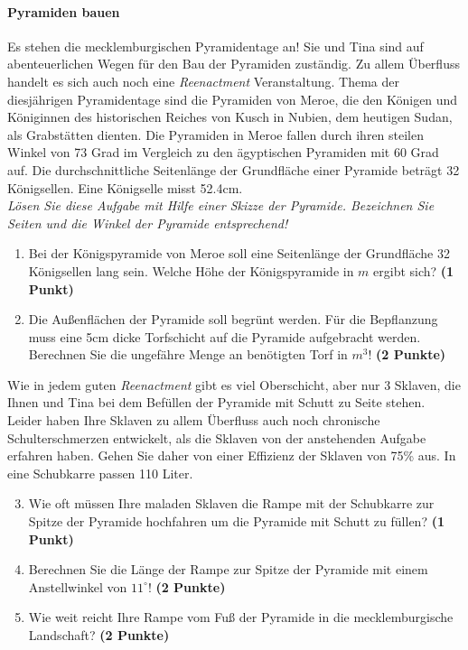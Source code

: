 \documentclass[a4paper, 9pt]{scrartcl}\usepackage[]{graphicx}\usepackage[]{xcolor}
\begin{document}
\paragraph{Pyramiden bauen}



Es stehen die mecklemburgischen Pyramidentage an! Sie und Tina sind auf abenteuerlichen Wegen für den Bau der Pyramiden zuständig. Zu allem Überfluss handelt es sich auch noch eine \textit{Reenactment} Veranstaltung. Thema der diesjährigen Pyramidentage sind die Pyramiden von Meroe, die den Königen und Königinnen des historischen Reiches von Kusch in Nubien, dem heutigen Sudan, als Grabstätten dienten. Die Pyramiden in Meroe fallen durch ihren steilen Winkel von 73 Grad im Vergleich zu den ägyptischen Pyramiden mit 60 Grad auf. Die durchschnittliche Seitenlänge der Grundfläche einer Pyramide beträgt 32 Königsellen. Eine Königselle misst 52.4cm.\\

\textit{Lösen Sie diese Aufgabe mit Hilfe einer Skizze der Pyramide. Bezeichnen Sie Seiten und die Winkel der Pyramide entsprechend!}

\begin{enumerate}
\item Bei der Königspyramide von Meroe soll eine Seitenlänge der Grundfläche 32 Königsellen lang sein. Welche Höhe der Königspyramide in $m$ ergibt sich? \textbf{(1 Punkt)}
\item Die Außenflächen der Pyramide soll begrünt werden. Für die Bepflanzung muss eine 5cm dicke Torfschicht auf die Pyramide aufgebracht werden. Berechnen Sie die ungefähre Menge an benötigten Torf in $m^3$! \textbf{(2 Punkte)}
\end{enumerate}

Wie in jedem guten \textit{Reenactment} gibt es viel Oberschicht, aber nur 3 Sklaven, die Ihnen und Tina bei dem Befüllen der Pyramide mit Schutt zu Seite stehen. Leider haben Ihre Sklaven zu allem Überfluss auch noch chronische Schulterschmerzen entwickelt, als die Sklaven von der anstehenden Aufgabe erfahren haben. Gehen Sie daher von einer Effizienz der Sklaven von 75\% aus. In eine Schubkarre passen 110 Liter.

\begin{enumerate}
  \setcounter{enumi}{2}
\item Wie oft müssen Ihre maladen Sklaven die Rampe mit der Schubkarre zur Spitze der Pyramide hochfahren um die Pyramide mit Schutt zu füllen? \textbf{(1 Punkt)}
\item Berechnen Sie die Länge der Rampe zur Spitze der Pyramide mit einem Anstellwinkel von $11^\circ$! \textbf{(2 Punkte)}
\item Wie weit reicht Ihre Rampe vom Fuß der Pyramide in die mecklemburgische Landschaft?  \textbf{(2 Punkte)}
\end{enumerate}
\end{document}
